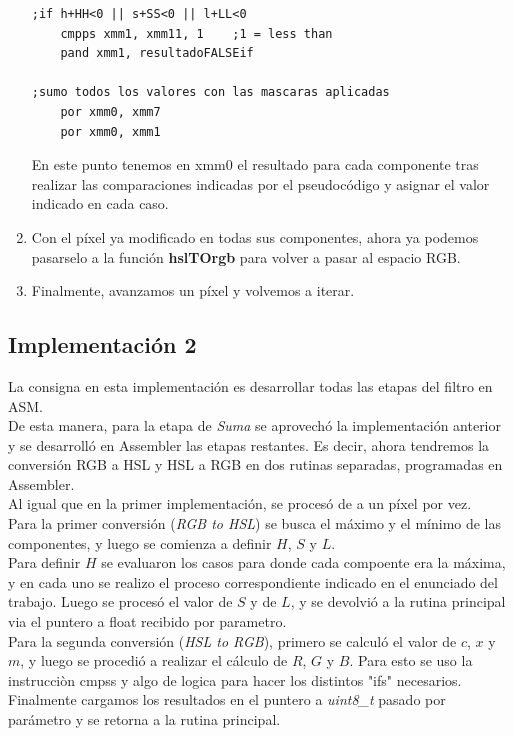 \begin{enumerate}
\begin{lstlisting}
;if h+HH<0 || s+SS<0 || l+LL<0
	cmpps xmm1,	xmm11, 1	;1 = less than
	pand xmm1, resultadoFALSEif

;sumo todos los valores con las mascaras aplicadas
	por xmm0, xmm7
	por xmm0, xmm1
\end{lstlisting}
En este punto tenemos en xmm0 el resultado para cada componente tras realizar las comparaciones indicadas por el pseudocódigo y asignar el valor indicado en cada caso. 
\item Con el píxel ya modificado en todas sus componentes, ahora ya podemos pasarselo a la función \textbf{hslTOrgb} para volver a pasar al espacio RGB.
\item Finalmente, avanzamos un píxel y volvemos a iterar.

\end{enumerate}

\subsection{Implementación 2}
La consigna en esta implementación es desarrollar todas las etapas del filtro en ASM.\\
De esta manera, para la etapa de \textit{Suma} se aprovechó la implementación anterior y se desarrolló en Assembler las etapas restantes. Es decir, ahora tendremos la conversión RGB a HSL y HSL a RGB en dos rutinas separadas, programadas en Assembler.\\

Al igual que en la primer implementación, se procesó de a un píxel por vez.\\

Para la primer conversión (\textit{RGB to HSL}) se busca el máximo y el mínimo de las componentes, y luego se comienza a definir $H$, $S$ y $L$.\\
Para definir $H$ se evaluaron los casos para donde cada compoente era la máxima, y en cada uno se realizo el proceso correspondiente indicado en el enunciado del trabajo. Luego se procesó el valor de $S$ y de $L$, y se devolvió a la rutina principal via el puntero a float recibido por parametro.\\

Para la segunda conversión (\textit{HSL to RGB}), primero se calculó el valor de $c$, $x$ y $m$, y luego se procedió a realizar el cálculo de $R$, $G$ y $B$. Para esto se uso la instrucciòn cmpss y algo de logica para hacer los distintos "ifs" necesarios.\\
Finalmente cargamos los resultados en el puntero a \textit{uint8\_t} pasado por parámetro y se retorna a la rutina principal.\\

